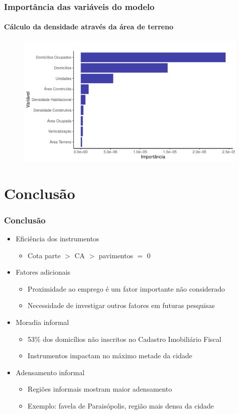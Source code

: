 \documentclass[%
    9pt, 
    aspectratio=169,
]{beamer}
\begin{document}
\begin{frame}
    \frametitle{Importância das variáveis do modelo}
    \framesubtitle{Cálculo da densidade através da área de terreno}
    \begin{figure}
        \includegraphics[width = .8\textwidth]{imagens/var_importance_densmod.pdf}
    \end{figure}
\end{frame}


\section{Conclusão}

\begin{frame}
    \frametitle{Conclusão}
    \begin{itemize}
        \item Eficiência dos instrumentos
        \begin{itemize}
            \item Cota parte $>$ CA $>$ pavimentos $=$ 0
        \end{itemize}
        \item Fatores adicionais
        \begin{itemize}
            \item Proximidade ao emprego é um fator importante não considerado
            \item Necessidade de investigar outros fatores em futuras pesquisas
        \end{itemize}
        \item Moradia informal
        \begin{itemize}
            \item 53\% dos domicílios não inscritos no Cadastro Imobiliário Fiscal
            \item Instrumentos impactam no máximo metade da cidade
        \end{itemize}
        \item Adensamento informal
        \begin{itemize}
            \item Regiões informais mostram maior adensamento
            \item Exemplo: favela de Paraisópolis, região mais densa da cidade
        \end{itemize}
    \end{itemize}
\end{frame}
\end{document}
